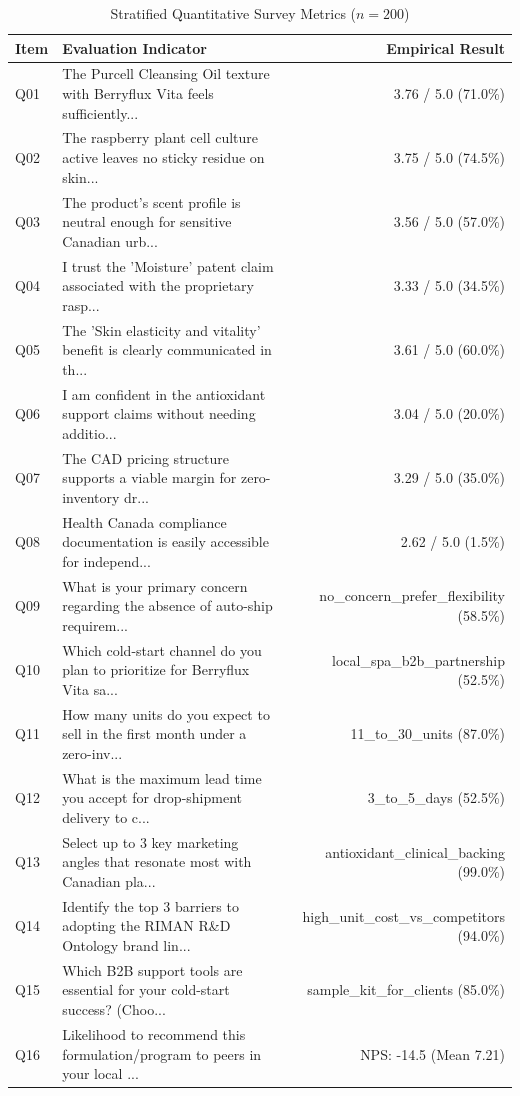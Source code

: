 \documentclass[10pt,twocolumn,a4paper]{article}
\begin{document}
\begin{table}[t]
\centering
\caption{Stratified Quantitative Survey Metrics ($n = 200$)}
\label{tab:metrics}
\small
\begin{tabularx}{\textwidth}{l X r}
\toprule
\textbf{Item} & \textbf{Evaluation Indicator} & \textbf{Empirical Result} \\
\midrule
Q01 & The Purcell Cleansing Oil texture with Berryflux Vita feels sufficiently... & 3.76 / 5.0 (71.0\%) \\
Q02 & The raspberry plant cell culture active leaves no sticky residue on skin... & 3.75 / 5.0 (74.5\%) \\
Q03 & The product's scent profile is neutral enough for sensitive Canadian urb... & 3.56 / 5.0 (57.0\%) \\
Q04 & I trust the 'Moisture' patent claim associated with the proprietary rasp... & 3.33 / 5.0 (34.5\%) \\
Q05 & The 'Skin elasticity and vitality' benefit is clearly communicated in th... & 3.61 / 5.0 (60.0\%) \\
Q06 & I am confident in the antioxidant support claims without needing additio... & 3.04 / 5.0 (20.0\%) \\
Q07 & The CAD pricing structure supports a viable margin for zero-inventory dr... & 3.29 / 5.0 (35.0\%) \\
Q08 & Health Canada compliance documentation is easily accessible for independ... & 2.62 / 5.0 (1.5\%) \\
Q09 & What is your primary concern regarding the absence of auto-ship requirem... & no\_concern\_prefer\_flexibility (58.5\%) \\
Q10 & Which cold-start channel do you plan to prioritize for Berryflux Vita sa... & local\_spa\_b2b\_partnership (52.5\%) \\
Q11 & How many units do you expect to sell in the first month under a zero-inv... & 11\_to\_30\_units (87.0\%) \\
Q12 & What is the maximum lead time you accept for drop-shipment delivery to c... & 3\_to\_5\_days (52.5\%) \\
Q13 & Select up to 3 key marketing angles that resonate most with Canadian pla... & antioxidant\_clinical\_backing (99.0\%) \\
Q14 & Identify the top 3 barriers to adopting the RIMAN R\&D Ontology brand lin... & high\_unit\_cost\_vs\_competitors (94.0\%) \\
Q15 & Which B2B support tools are essential for your cold-start success? (Choo... & sample\_kit\_for\_clients (85.0\%) \\
Q16 & Likelihood to recommend this formulation/program to peers in your local ... & NPS: -14.5 (Mean 7.21) \\
\bottomrule
\end{tabularx}
\end{table}
\end{document}
